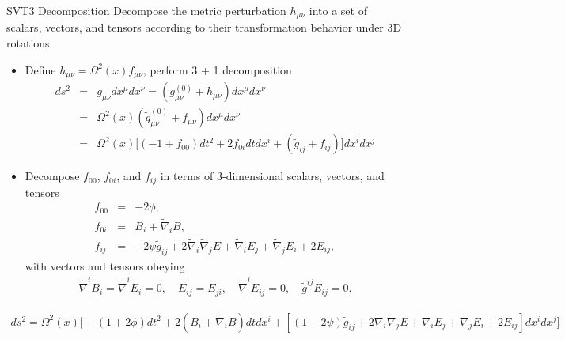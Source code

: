\documentclass[8pt,aspectratio=1610]{beamer}
\begin{document}
\begin{frame}{SVT3 Decomposition}
	Decompose the metric perturbation $h_{\mu\nu}$ into a set of scalars, vectors, and tensors according to their transformation behavior under 3D rotations
	\begin{itemize}
		\item Define $h_{\mu\nu} = \Omega^2(x)f_{\mu\nu}$, perform 3 + 1 decomposition
		\begin{eqnarray}
			ds^2 &=& g_{\mu\nu}dx^\mu dx^\nu = (g_{\mu\nu}^{(0)} + h_{\mu\nu})dx^\mu dx^\nu
			\nonumber\\
			&=& \Omega^2(x)(\tilde g_{\mu\nu}^{(0)} + f_{\mu\nu})dx^\mu dx^\nu
			\nonumber\\
			&=& \Omega^2(x)\big[(-1+f_{00})dt^2 + 2f_{0i}dtdx^i + (\tilde g_{ij} + f_{ij})\big]dx^i dx^j
		\end{eqnarray}
		\item Decompose $f_{00}$, $f_{0i}$, and $f_{ij}$ in terms of 3-dimensional scalars, vectors, and tensors
		\begin{eqnarray}
			f_{00} &=& -2\phi,
			\nonumber\\
			f_{0i} &=& B_i + \tilde\nabla_i B,
			\nonumber\\
			f_{ij} &=& -2\psi \tilde g_{ij} + 2\tilde\nabla_i \tilde\nabla_j E + \tilde\nabla_i E_j + \tilde\nabla_j E_i + 2E_{ij},
		\end{eqnarray}
		with vectors and tensors obeying
		\begin{eqnarray}
			\tilde\nabla^i B_i = \tilde\nabla^i E_i = 0,\quad E_{ij} = E_{ji},\quad\tilde\nabla^i E_{ij} = 0,\quad \tilde g^{ij}E_{ij} = 0.
		\end{eqnarray}
	\end{itemize}
	\begin{eqnarray}
		ds^2 = \Omega^2(x)\bigg[-(1+2\phi)dt^2 + 2(B_i + \tilde\nabla_i B)dt dx^i 
		+ [(1-2\psi)\tilde g_{ij} + 2\tilde\nabla_i \tilde\nabla_j E + \tilde\nabla_i E_j + \tilde\nabla_j E_i + 2E_{ij}]dx^i dx^j\bigg]
	\end{eqnarray}
\end{frame}

\end{document}
